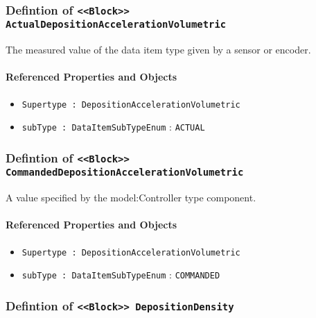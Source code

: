 \subsubsection{Defintion of \texttt{<<Block>> ActualDepositionAccelerationVolumetric}}
  \label{type:ActualDepositionAccelerationVolumetric}

\FloatBarrier

The measured value of the data item type given by a sensor or encoder.

\FloatBarrier
\paragraph{Referenced Properties and Objects}

\begin{itemize}
\item \texttt{Supertype : DepositionAccelerationVolumetric}

\item \texttt{subType : DataItemSubTypeEnum} : \texttt{ACTUAL}

\end{itemize}
\FloatBarrier
\subsubsection{Defintion of \texttt{<<Block>> CommandedDepositionAccelerationVolumetric}}
  \label{type:CommandedDepositionAccelerationVolumetric}

\FloatBarrier

A value specified by the {model:Controller} type component.

\FloatBarrier
\paragraph{Referenced Properties and Objects}

\begin{itemize}
\item \texttt{Supertype : DepositionAccelerationVolumetric}

\item \texttt{subType : DataItemSubTypeEnum} : \texttt{COMMANDED}

\end{itemize}
\FloatBarrier
\subsubsection{Defintion of \texttt{<<Block>> DepositionDensity}}
  \label{type:DepositionDensity}

